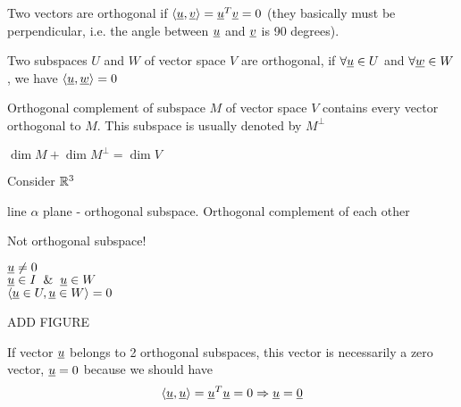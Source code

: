 \begin{remark}
Two vectors are orthogonal if $\langle\underline{u},\underline{v}\rangle = \underline{u}^T\underline{v} = 0$ (they basically must be perpendicular, i.e. the angle between  $\underline{u}$ and $\underline{v}$ is 90 degrees).
\end{remark}
\begin{definition}
Two subspaces $U$ and $W$ of vector space $V$ are orthogonal, if $\forall \underline{u}\in U$ and $\forall \underline{w}\in W$, we have $\langle \underline{u},\underline{w}\rangle = 0$
\end{definition}

\begin{definition}
Orthogonal complement of subspace $M$ of vector space $V$ contains every vector orthogonal to $M$. This subspace is usually denoted by $M^\perp$
\end{definition}

\begin{remark}
$\dim M+\dim M^\perp = \dim V$	
\end{remark}
\begin{example}
Consider $\mathbb{R}^3$
\begin{center}
\end{center}
line $\alpha$ plane	- orthogonal subspace. Orthogonal complement of each other
\end{example}
\begin{example}
Not orthogonal subspace!\\
\begin{minipage}[t]{0.45\linewidth}
$\underline{u}\not=0$\\
$\underline{u}\in I \hspace{2mm}\& \hspace{2mm}\underline{u}\in W$\\
$\langle \underline{u}\in U,\underline{u}\in W\rangle=0$
\end{minipage}
\begin{minipage}[t]{0.45\linewidth}
ADD FIGURE	
\end{minipage}
\end{example}

\begin{note}
If vector $\underline{u}$ belongs to 2 orthogonal subspaces, this vector is necessarily a zero vector, $\underline{u} = 0$ because we should have 
\[
\langle\underline{u},\underline{u}\rangle = \underline{u}^T\underline{u} = 0\Rightarrow \underline{u} = \underline{0}
\]
\end{note}

























